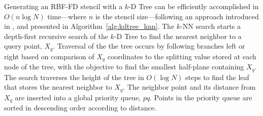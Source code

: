 \documentclass{report}
\begin{document}
Generating an RBF-FD stencil with a $k$-D Tree can be efficiently accomplished in $O(n \log{N})$ time---where $n$ is the stencil size---following an approach introduced in \cite{Friedman1977}, and presented in Algorithm~\ref{alg:kdtree_knn}. The $k$-NN search starts a depth-first recursive search of the $k$-D Tree to find the nearest neighbor to a query point, $X_q$. Traversal of the the tree occurs by following branches left or right based on comparison of $X_q$ coordinates to the splitting value stored at each node of the tree, with the objective to find the smallest half-plane containing $X_q$. The search traverses the height of the tree in $O(\log N)$ steps to find the leaf that stores the nearest neighbor to $X_q$. The neighbor point and its distance from $X_q$ are inserted into a global priority queue, $pq$. Points in the priority queue are sorted in descending order according to distance. 
\end{document}
